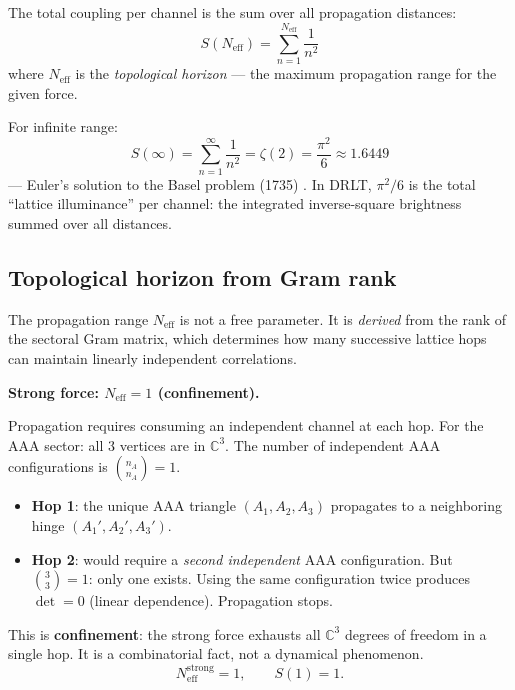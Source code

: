 \documentclass[12pt]{article}
\theoremstyle{remark}
\theoremstyle{definition}
\begin{document}
The total coupling per channel is the sum over all propagation distances:
\begin{equation}
S(N_\text{eff}) = \sum_{n=1}^{N_\text{eff}} \frac{1}{n^2}
\label{eq:partial_Basel}
\end{equation}
where $N_\text{eff}$ is the \emph{topological horizon} --- the maximum propagation range for the given force.

For infinite range:
\begin{equation}
S(\infty) = \sum_{n=1}^{\infty} \frac{1}{n^2} = \zeta(2) = \frac{\pi^2}{6} \approx 1.6449
\end{equation}
--- Euler's solution to the Basel problem (1735) \cite{Euler}. In DRLT, $\pi^2/6$ is the total ``lattice illuminance'' per channel: the integrated inverse-square brightness summed over all distances.

\subsection{Topological horizon from Gram rank}
\label{sec:Neff}

The propagation range $N_\text{eff}$ is not a free parameter. It is \emph{derived} from the rank of the sectoral Gram matrix, which determines how many successive lattice hops can maintain linearly independent correlations.

\bigskip

\noindent\textbf{Strong force: $N_\text{eff} = 1$ (confinement).}

Propagation requires consuming an independent channel at each hop. For the AAA sector: all 3 vertices are in $\mathbb{C}^3$. The number of independent AAA configurations is $\binom{n_A}{n_A} = 1$.

\begin{itemize}
\item \textbf{Hop 1}: the unique AAA triangle $(A_1, A_2, A_3)$ propagates to a neighboring hinge $(A_1', A_2', A_3')$.
\item \textbf{Hop 2}: would require a \emph{second independent} AAA configuration. But $\binom{3}{3} = 1$: only one exists. Using the same configuration twice produces $\det = 0$ (linear dependence). Propagation stops.
\end{itemize}

This is \textbf{confinement}: the strong force exhausts all $\mathbb{C}^3$ degrees of freedom in a single hop. It is a combinatorial fact, not a dynamical phenomenon.
\begin{equation}
N_\text{eff}^\text{strong} = 1, \qquad S(1) = 1.
\end{equation}
\end{document}
